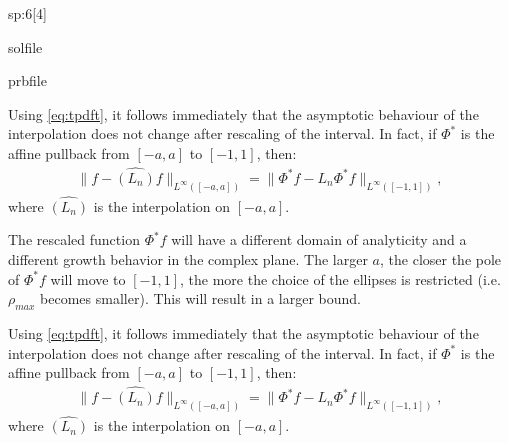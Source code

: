 \begin{samproblem}
\begin{subproblem}{sp:6}[4]
\begin{samwriteprbpart}{solfile}
\begin{writeverbatim}{prbfile}
\begin{samsolution}
        Using \cref{eq:tpdft}, it follows immediately that the asymptotic behaviour of the interpolation does not change after rescaling of the interval. 
        In fact, if $\Phi^*$ is the affine pullback from $[-a,a]$ to $[-1,1]$, then:
        \begin{align*}
          \lVert f - \hat{(L_n)} f \rVert_{L^\infty([-a,a])} = \lVert \Phi^* f - L_n \Phi^* f \rVert_{L^\infty([-1,1])},
        \end{align*}
        where $\hat{(L_n)}$ is the interpolation on $[-a,a]$.
      \end{samsolution}
    \end{writeverbatim}
  \end{samwriteprbpart}
 \begin{solution}
   The rescaled function $\Phi^{\ast}f$ will have a different domain of analyticity and a different growth behavior in the complex plane. 
   The larger $a$, the closer the pole of $\Phi^{\ast}f$ will move to $[-1,1]$, the more the choice of the ellipses is restricted 
   (i.e. $\rho_{max}$ becomes smaller). This will result in a larger bound.
   
   Using \cref{eq:tpdft}, it follows immediately that the asymptotic behaviour of the interpolation does not change after rescaling of the interval. 
   In fact, if $\Phi^*$ is the affine pullback from $[-a,a]$ to $[-1,1]$, then:
   \begin{align*}
     \lVert f - \hat{(L_n)} f \rVert_{L^\infty([-a,a])} = \lVert \Phi^* f - L_n \Phi^* f \rVert_{L^\infty([-1,1])},
   \end{align*}
   where $\hat{(L_n)}$ is the interpolation on $[-a,a]$.
 \end{solution}
\fi
\end{subproblem}

\end{samproblem}
